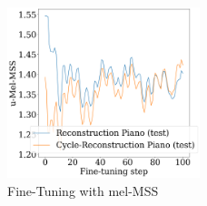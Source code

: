 \begin{figure}
    \centering
    \includegraphics[width=0.5\textwidth]{figures/fine-tuning/mel/metrics.png}
\caption{Fine-Tuning with mel-MSS}
\label{fig:tuning-mel}
\end{figure}

